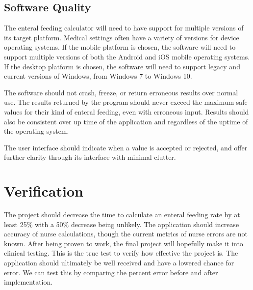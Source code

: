 \documentclass[fullpage,10pt, onecolumn, draftclsnofoot]{IEEEtran}
\begin{document}
\subsection{Software Quality}
The enteral feeding calculator will need to have support for multiple versions of its target platform. Medical settings often
have a variety of versions for device operating systems. If the mobile platform is chosen, the software will need to support 
multiple versions of both the Android and iOS mobile operating systems. If the desktop platform is chosen, the software will need
to support legacy and current versions of Windows, from Windows 7 to Windows 10.

The software should not crash, freeze, or return erroneous results over normal use. The results returned by the program should never
exceed the maximum safe values for their kind of enteral feeding, even with erroneous input. Results should also be consistent over
up time of the application and regardless of the uptime of the operating system.

The user interface should indicate when a value is accepted or rejected, and offer further clarity through its interface with minimal clutter.

\section{Verification}
The project should decrease the time to calculate an enteral feeding rate by at least 25\% with a  50\% decrease being unlikely.
The application should increase accuracy of nurse calculations, though the current metrics of nurse errors are not known.
After being proven to work, the final project will hopefully make it into clinical testing. This is the true test to verify how effective the project is. The application should ultimately be well received and have a lowered chance for error. We can test this by comparing the percent error before and after implementation.
\end{document}

